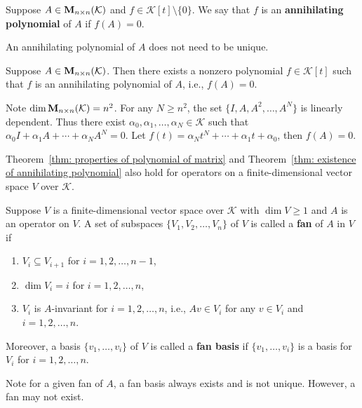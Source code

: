 \begin{definitionenv}
    Suppose $A\in \mathbf{M}_{n\times n}(\mathcal{K})$ and $f\in \mathcal{K}[t]\setminus \{0\}$. We say that $f$ is an \textbf{annihilating polynomial} of $A$ if $f(A) = 0$.
\end{definitionenv}
\begin{remarkenv}
    An annihilating polynomial of $A$ does not need to be unique. 
\end{remarkenv}
\begin{theoremenv}\label{thm: existence of annihilating polynomial}
    Suppose $A\in \mathbf{M}_{n\times n}(\mathcal{K})$. Then there exists a nonzero polynomial $f\in \mathcal{K}[t]$ such that $f$ is an annihilating polynomial of $A$, i.e., $f(A) = 0$.
\end{theoremenv}
\begin{proofenv}
    Note $\dim \mathbf{M}_{n\times n}(\mathcal{K}) = n^2$. For any $N \ge n^2$, the set $\{ I, A, A^2, \ldots, A^N \}$ is linearly dependent. Thus there exist $\alpha_0, \alpha_1, \ldots, \alpha_N \in \mathcal K$ such that $\alpha_0 I + \alpha_1 A + \cdots + \alpha_N A^N = 0$. Let $f(t) = \alpha_N t^N + \cdots + \alpha_1 t + \alpha_0$, then $f(A) = 0$.
\end{proofenv}
\begin{remarkenv}
    Theorem~\ref{thm: properties of polynomial of matrix} and Theorem~\ref{thm: existence of annihilating polynomial} also hold for operators on a finite-dimensional vector space $V$ over $\mathcal K$.
\end{remarkenv}
\begin{definitionenv}
    Suppose $V$ is a finite-dimensional vector space over $\mathcal K$ with $\dim V\ge 1$ and $A$ is an operator on $V$. A set of subspaces $\{ V_1, V_2, \ldots, V_n \}$ of $V$ is called a \textbf{fan} of $A$ in $V$ if
    \begin{enumerate}[label=(\arabic*)]
        \item $V_i \subseteq V_{i+1}$ for $i=1,2,\ldots,n-1$,
        \item $\dim V_i = i$ for $i=1,2,\ldots,n$,
        \item $V_i$ is $A$-invariant for $i=1,2,\ldots,n$, i.e., $A v \in V_i$ for any $v\in V_i$ and $i=1,2,\ldots,n$.
    \end{enumerate}
    Moreover, a basis $\{ v_1, \ldots, v_i \}$ of $V$ is called a \textbf{fan basis} if $\{ v_1, \ldots, v_i \}$ is a basis for $V_i$ for $i=1,2,\ldots,n$.
\end{definitionenv}
\begin{remarkenv}
    Note for a given fan of $A$, a fan basis always exists and is not unique. However, a fan may not exist.
\end{remarkenv}
